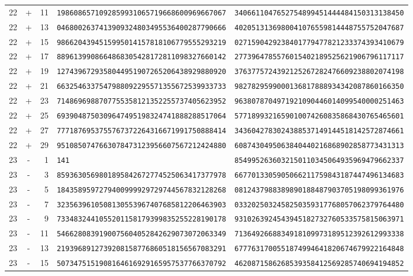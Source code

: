 \begin{longtable}{@{}rcrll@{}}
22&+&11&\texttt{1986086571092859931065719668600969667067}&\texttt{3406611047652754899451444484150313138450}\\
22&+&13&\texttt{0468002637413909324803495536400287790666}&\texttt{4020513136980041076559814448755752047687}\\
22&+&15&\texttt{9866204394515995014157818106779555293219}&\texttt{0271590429238401779477821233374393410679}\\
22&+&17&\texttt{8896139908664868305428172811098327660142}&\texttt{2773964785576015402189525621906796117117}\\
22&+&19&\texttt{1274396729358044951907265206438929880920}&\texttt{3763775724392125267282476609238802074198}\\
22&+&21&\texttt{6632546337547988092295571355672539933733}&\texttt{9827829599000136817888934342087860166350}\\
22&+&23&\texttt{7148696988707755358121352255737405623952}&\texttt{9638078704971921090446014099540000251463}\\
22&+&25&\texttt{6939048750309647495198324741888288517064}&\texttt{5771899321659010074260835868430765465601}\\
22&+&27&\texttt{7771876953755767372264316671991750888414}&\texttt{3436042783024388537149144518142572874661}\\
22&+&29&\texttt{9510850747663078473123956607567212424880}&\texttt{6087430495063840440216868902858773431313}\\
23&-&1&\texttt{141}&\texttt{8549952636032150110345064935969479662337}\\
23&-&3&\texttt{8593630569801895842672774525063417377978}&\texttt{6677013305905066211759843187447496134683}\\
23&-&5&\texttt{1843589597279400999929729744567832128268}&\texttt{0812437988389890188487903705198099361976}\\
23&-&7&\texttt{3235639610508130553967407685812206463903}&\texttt{0332025032458250359317768057062379764480}\\
23&-&9&\texttt{7334832441055201158179399835255228190178}&\texttt{9310263924543945182732760533575815063971}\\
23&-&11&\texttt{5466280839190075604052842629073072063349}&\texttt{7136492668834918109973189512392612993338}\\
23&-&13&\texttt{2193968912739208158776860518156567083291}&\texttt{6777631700551874994641820674679922164848}\\
23&-&15&\texttt{5073475151908164616929165957537766370792}&\texttt{4620871586268539358412569285740694194852}\\

\end{longtable}
